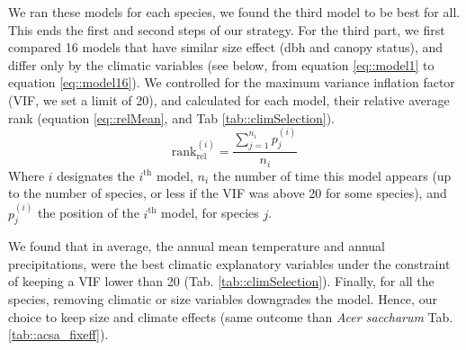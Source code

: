 \documentclass[letterpaper, 12pt]{article}
\theoremstyle{theo}
\begin{document}
\begin{refsection}
\begin{onehalfspace}
We ran these models for each species, we found the third model to be best for all. This ends the first and second steps of our strategy. For the third part, we first compared 16 models that have similar size effect (dbh and canopy status), and differ only by the climatic variables (see below, from equation \eqref{eq::model1} to equation \eqref{eq::model16}). We controlled for the maximum variance inflation factor (VIF, we set a limit of 20), and calculated for each model, their relative average rank (equation \eqref{eq::relMean}, and Tab \ref{tab::climSelection}).
\begin{equation} \label{eq::relMean}
	\text{rank}_{\text{rel}}^{(i)} = \dfrac{\sum_{j = 1}^{n_i} p_j^{(i)}}{n_i}
\end{equation}
Where $ i $ designates the $ i^{\text{th}} $ model, $ n_i $ the number of time this model appears (up to the number of species, or less if the VIF was above 20 for some species), and $ p_j^{(i)} $ the position of the $ i^{\text{th}} $ model, for species $ j $.

We found that in average, the annual mean temperature and annual precipitations, were the best climatic explanatory variables under the constraint of keeping a VIF lower than 20 (Tab. \ref{tab::climSelection}). Finally, for all the species, removing climatic or size variables downgrades the model. Hence, our choice to keep size and climate effects (same outcome than \textit{Acer saccharum} Tab. \ref{tab::acsa_fixeff}).


\end{onehalfspace}
\end{refsection}
\end{document}
